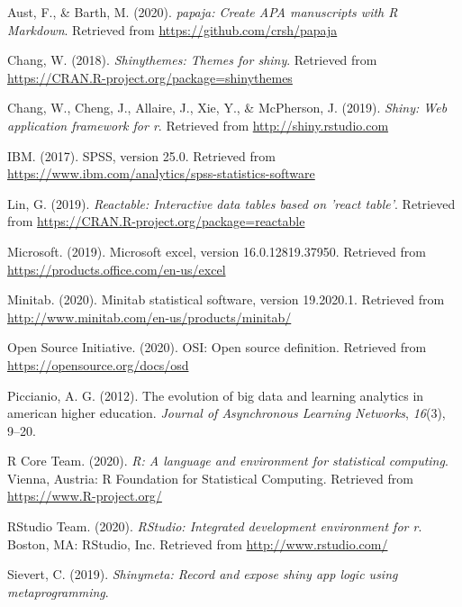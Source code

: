 \documentclass[english,man,floatsintext]{apa6}
\begin{document}
\hypertarget{refs}{}
\leavevmode\hypertarget{ref-R-papaja}{}%
Aust, F., \& Barth, M. (2020). \emph{papaja: Create APA manuscripts with R Markdown}. Retrieved from \url{https://github.com/crsh/papaja}

\leavevmode\hypertarget{ref-R-shinythemes}{}%
Chang, W. (2018). \emph{Shinythemes: Themes for shiny}. Retrieved from \url{https://CRAN.R-project.org/package=shinythemes}

\leavevmode\hypertarget{ref-R-shiny}{}%
Chang, W., Cheng, J., Allaire, J., Xie, Y., \& McPherson, J. (2019). \emph{Shiny: Web application framework for r}. Retrieved from \url{http://shiny.rstudio.com}

\leavevmode\hypertarget{ref-spss}{}%
IBM. (2017). SPSS, version 25.0. Retrieved from \url{https://www.ibm.com/analytics/spss-statistics-software}

\leavevmode\hypertarget{ref-R-reactable}{}%
Lin, G. (2019). \emph{Reactable: Interactive data tables based on 'react table'}. Retrieved from \url{https://CRAN.R-project.org/package=reactable}

\leavevmode\hypertarget{ref-excel}{}%
Microsoft. (2019). Microsoft excel, version 16.0.12819.37950. Retrieved from \url{https://products.office.com/en-us/excel}

\leavevmode\hypertarget{ref-minitab}{}%
Minitab. (2020). Minitab statistical software, version 19.2020.1. Retrieved from \url{http://www.minitab.com/en-us/products/minitab/}

\leavevmode\hypertarget{ref-osd}{}%
Open Source Initiative. (2020). OSI: Open source definition. Retrieved from \url{https://opensource.org/docs/osd}

\leavevmode\hypertarget{ref-bigdata1}{}%
Piccianio, A. G. (2012). The evolution of big data and learning analytics in american higher education. \emph{Journal of Asynchronous Learning Networks}, \emph{16}(3), 9--20.

\leavevmode\hypertarget{ref-R-base}{}%
R Core Team. (2020). \emph{R: A language and environment for statistical computing}. Vienna, Austria: R Foundation for Statistical Computing. Retrieved from \url{https://www.R-project.org/}

\leavevmode\hypertarget{ref-rstudio}{}%
RStudio Team. (2020). \emph{RStudio: Integrated development environment for r}. Boston, MA: RStudio, Inc. Retrieved from \url{http://www.rstudio.com/}

\leavevmode\hypertarget{ref-R-shinymeta}{}%
Sievert, C. (2019). \emph{Shinymeta: Record and expose shiny app logic using metaprogramming}.
\end{document}

